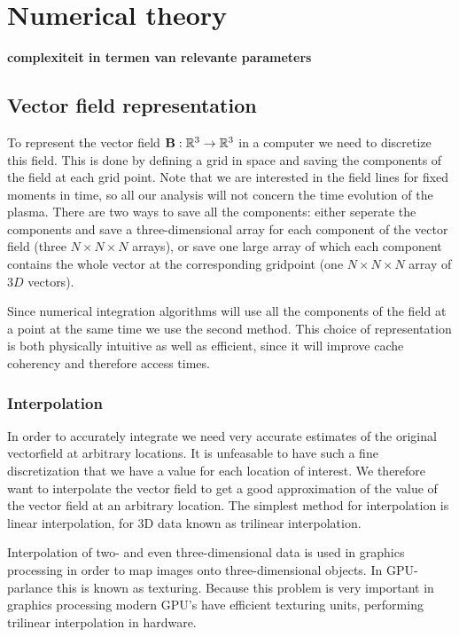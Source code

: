 \documentclass{article}
\renewcommand{\vec}{\bold}
\begin{document}
\section{Numerical theory}
{\bf complexiteit in termen van relevante parameters}
\subsection{Vector field representation}
To represent the vector field $\vec{B}: \mathbb{R}^3 \to \mathbb{R}^3$ in a computer we need to discretize this field. This is done by defining a grid in space and saving the components of the field at each grid point. Note that we are interested in the field lines for fixed moments in time, so all our analysis will not concern the time evolution of the plasma. There are two ways to save all the components: either seperate the components and save a three-dimensional array for each component of the vector field (three $N\times N\times N$ arrays), or save one large array of which each component contains the whole vector at the corresponding gridpoint (one $N\times N\times N$ array of $3D$ vectors).

Since numerical integration algorithms will use all the components of the field at a point at the same time we use the second method. %
This choice of representation is both physically intuitive as well as efficient, since it will improve cache coherency and therefore access times.

\subsubsection{Interpolation}
In order to accurately integrate we need very accurate estimates of the original vectorfield at arbitrary locations. It is unfeasable to have such a fine discretization that we have a value for each location of interest. We therefore want to interpolate the vector field to get a good approximation of the value of the vector field at an arbitrary location. The simplest method for interpolation is linear interpolation, for 3D data known as trilinear interpolation.

Interpolation of two- and even three-dimensional data is used in graphics processing in order to map images onto three-dimensional objects. In GPU-parlance this is known as texturing. Because this problem is very important in graphics processing modern GPU's have efficient texturing units, performing trilinear interpolation in hardware.
\end{document}
